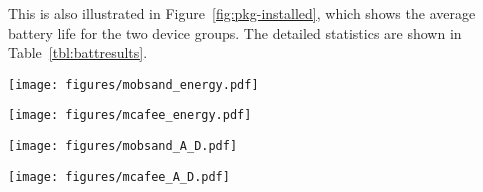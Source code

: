 This is also illustrated in Figure~\ref{fig:pkg-installed}, which
shows the average battery life for the two device groups.  The
detailed statistics are shown in Table~\ref{tbl:battresults}.




\begin{figure*}[!htb]
  \centering
  \begin{minipage}{0.42\textwidth}
    \centering
    \texttt{[image: figures/mobsand\_energy.pdf]}
    \label{fig:package-device-dc-package-MB}
  \end{minipage}  
\begin{minipage}{0.42\textwidth}
    \centering
    \texttt{[image: figures/mcafee\_energy.pdf]}
    \label{fig:package-device-dc-package-MC}
  \end{minipage}  
  \caption{Average battery life. \label{fig:energy}}
\end{figure*}






\begin{figure*}[!htb]
  \centering
  \begin{minipage}{0.42\textwidth}
    \centering
    \texttt{[image: figures/mobsand\_A\_D.pdf]}
    \label{fig:package-device-dc-package-MB}
  \end{minipage}  
\begin{minipage}{0.42\textwidth}
    \centering
    \texttt{[image: figures/mcafee\_A\_D.pdf]}
    \label{fig:package-device-dc-package-MC}
  \end{minipage}  
  \caption{Distribution of number of installed packages. \label{fig:pkg-installed}}
\end{figure*}











